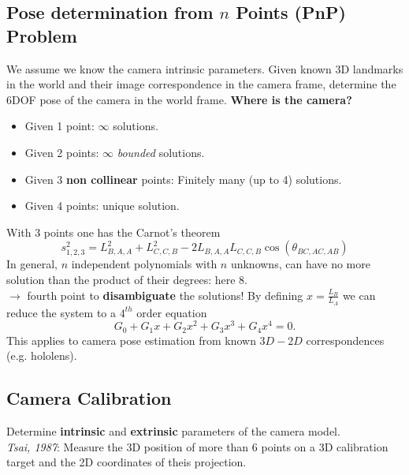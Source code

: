 \documentclass[a4paper,12 pt]{article}
\theoremstyle{definition}
\theoremstyle{remark}
\theoremstyle{definition}
\theoremstyle{definition}
\theoremstyle{definition}
\theoremstyle{remark}
\theoremstyle{definition}
\begin{document}
\subsection*{Pose determination from $n$ Points (PnP) Problem}
We assume we know the camera intrinsic parameters. Given known 3D landmarks in the world and their image correspondence in the camera frame, determine the 6DOF pose of the camera in the world frame. \textbf{Where is the camera?}
\begin{itemize}
\item Given 1 point: $\infty$ solutions.
\item Given 2 points: $\infty$ \textit{bounded} solutions.
\item Given 3 \textbf{non collinear} points: Finitely many (up to 4) solutions.
\item Given 4 points: unique solution.
\end{itemize}
With 3 points one has the Carnot's theorem
\begin{equation}
s_{1,2,3}^2=L_{B,A,A}^2+L_{C,C,B}^2-2L_{B,A,A}L_{C,C,B}\cos(\theta_{BC,AC,AB})
\end{equation}
In general, $n$ independent polynomials with $n$ unknowns, can have no more solution than the product of their degrees: here 8. \\
$\rightarrow$ fourth point to \textbf{disambiguate} the solutions! By defining $x=\frac{L_B}{L_A}$ we can reduce the system to a $4^{th}$ order equation
\begin{equation}
G_0+G_1x+G_2x^2+G_3x^3+G_4x^4=0.
\end{equation}
This applies to camera pose estimation from known $3D-2D$ correspondences (e.g. hololens).
\subsection*{Camera Calibration}
Determine \textbf{intrinsic} and \textbf{extrinsic} parameters of the camera model. \\
\textit{Tsai, 1987}: Measure the 3D position of more than 6 points on a 3D calibration target and the 2D coordinates of theis projection.
\end{document}
